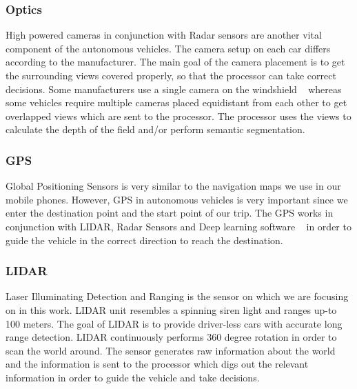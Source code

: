 \subsubsection{Optics}
High powered cameras in conjunction with Radar sensors are another vital component of the autonomous vehicles. The camera setup on each car differs according to the manufacturer. The main goal of the camera placement is to get the surrounding views covered properly, so that the processor can take correct decisions. Some manufacturers use a single camera on the windshield ~\cite{singlecamera} whereas some vehicles require multiple cameras placed equidistant from each other to get overlapped views which are sent to the processor. The processor uses the views to calculate the depth of the field and/or perform semantic segmentation.

\subsubsection{GPS}
Global Positioning Sensors is very similar to the navigation maps we use in our mobile phones. However, GPS in autonomous vehicles is very important since we enter the destination point and the start point of our trip. The GPS works in conjunction with LIDAR, Radar Sensors and Deep learning software ~\cite{GPS} in order to guide the vehicle in the correct direction to reach the destination.

\subsubsection{LIDAR}
Laser Illuminating Detection and Ranging is the sensor on which we are focusing on in this work. LIDAR unit resembles a spinning siren light and ranges up-to 100 meters. The goal of LIDAR is to provide driver-less cars with accurate long range detection. LIDAR continuously performs 360 degree rotation in order to scan the world around. The sensor generates raw information about the world and the information is sent to the processor which digs out the relevant information in order to guide the vehicle and take decisions.

